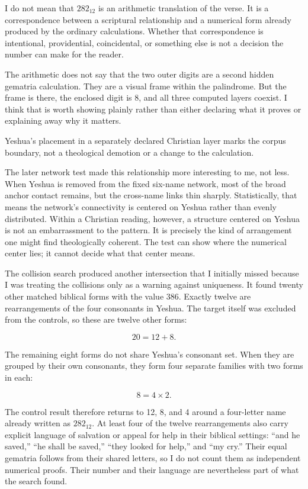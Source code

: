 I do not mean that $282_{12}$ is an arithmetic translation of the verse. It is a correspondence between a scriptural relationship and a numerical form already produced by the ordinary calculations. Whether that correspondence is intentional, providential, coincidental, or something else is not a decision the number can make for the reader.

The arithmetic does not say that the two outer digits are a second hidden gematria calculation. They are a visual frame within the palindrome. But the frame is there, the enclosed digit is 8, and all three computed layers coexist. I think that is worth showing plainly rather than either declaring what it proves or explaining away why it matters.

Yeshua's placement in a separately declared Christian layer marks the corpus boundary, not a theological demotion or a change to the calculation.

The later network test made this relationship more interesting to me, not less. When Yeshua is removed from the fixed six-name network, most of the broad anchor contact remains, but the cross-name links thin sharply. Statistically, that means the network's connectivity is centered on Yeshua rather than evenly distributed. Within a Christian reading, however, a structure centered on Yeshua is not an embarrassment to the pattern. It is precisely the kind of arrangement one might find theologically coherent. The test can show where the numerical center lies; it cannot decide what that center means.

The collision search produced another intersection that I initially missed because I was treating the collisions only as a warning against uniqueness. It found twenty other matched biblical forms with the value 386. Exactly twelve are rearrangements of the four consonants in Yeshua. The target itself was excluded from the controls, so these are twelve other forms:

\[
20=12+8.
\]

The remaining eight forms do not share Yeshua's consonant set. When they are grouped by their own consonants, they form four separate families with two forms in each:

\[
8=4\times2.
\]

The control result therefore returns to 12, 8, and 4 around a four-letter name already written as $282_{12}$. At least four of the twelve rearrangements also carry explicit language of salvation or appeal for help in their biblical settings: ``and he saved,'' ``he shall be saved,'' ``they looked for help,'' and ``my cry.'' Their equal gematria follows from their shared letters, so I do not count them as independent numerical proofs. Their number and their language are nevertheless part of what the search found.

